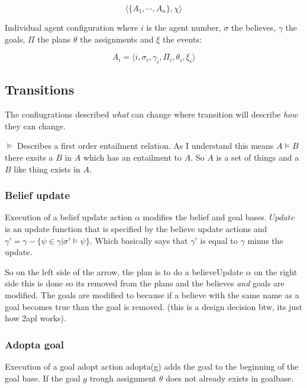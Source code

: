 \documentclass{article}
\begin{document}
\[\langle \{A_1, \cdots, A_n\}, \chi\rangle \]

Individual agent configuration where $i$ is the agent number, $\sigma$ the
believes, $\gamma$ the goals, $\Pi$ the plans $\theta$ the assignments and
$\xi$ the events:

\[A_i = \langle i, \sigma_i, \gamma_i, \Pi_i, \theta_i, \xi_i \rangle \]

\subsection{Transitions}
The confiugrations described \emph{what} can change where transition
will describe \emph{how} they can change.

$\vDash$ Describes a first order entailment relation. As I understand
this means $A \vDash B$ there exsits a $B$ in $A$ which has an entailment
to $A$. So $A$ is a set of things and a $B$ like thing exists in $A$.
\subsubsection{Belief update}
Execution of a belief update action $\alpha$ modifies the belief and goal
bases. $Update$ is an update function that is specified by the believe
update actions and $\gamma'=\gamma - \{\psi \in \gamma | \sigma' \vDash \psi\}$.
Which basically says that $\gamma'$ is equal to $\gamma$ minus the update.

\begin{prooftree}

\end{prooftree}

So on the left side of the arrow, the plan is to do a believeUpdate $\alpha$
on the right side this is done so its removed from the plans and the believes
\emph{and} goals are modified. The goals are modified to because if a believe
with the same name as a goal becomes true than the goal is removed. (this is
a design decision btw, its just how 2apl works).

\subsubsection{Adopta goal}
Execution of a goal adopt action adopta(g) adds the goal to the beginning of
the goal base. If the goal $g$ trough assignment $\theta$ does not already
exists in goalbase.
\end{document}
